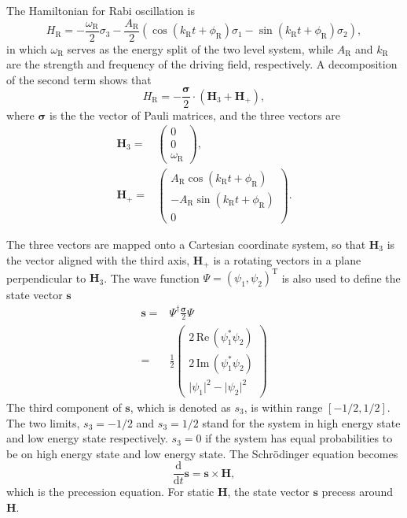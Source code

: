 \documentclass[%
reprint,
 amsmath,amssymb,
 prd,
]{revtex4-1}
\begin{document}
The Hamiltonian for Rabi oscillation is
\begin{equation}
    H_{\mathrm R} = -\frac{\omega_{\mathrm R}}{2}\sigma_3 - \frac{A_{\mathrm{R}} }{2}  \left( \cos(k_{\mathrm{R}} t +\phi_{\mathrm{R}})\sigma_1  - \sin(k_{\mathrm{R}} t +\phi_{\mathrm{R}}) \sigma_2\right),
    \label{rabi-oscillation-single-perturbation}
\end{equation}
in which $\omega_{\mathrm R}$ serves as the energy split of the two level system, while $A_{\mathrm{R}}$ and $k_{\mathrm{R}}$ are the strength and frequency of the driving field, respectively. A decomposition of the second term shows that
\begin{equation*}
H_{\mathrm R}
= - \frac{\boldsymbol{\sigma}}{2} \cdot (\mathbf{H}_3 + \mathbf{H}_+ ) ,
\end{equation*}
where $\boldsymbol{\sigma}$ is the the vector of Pauli matrices, and the three vectors are
\begin{align}
    \mathbf{H}_3 = & \begin{pmatrix}
    0 \\ 0 \\ \omega_{\mathrm R}
    \end{pmatrix}, \\
    \mathbf{H}_+ = & \begin{pmatrix}
    A_{\mathrm{R}} \cos(k_{\mathrm{R}} t +\phi_{\mathrm{R}}) \\
    - A_{\mathrm{R}} \sin(k_{\mathrm{R}} t +\phi_{\mathrm{R}}) \\
    0
    \end{pmatrix}.
\end{align}

The three vectors are mapped onto a Cartesian coordinate system, so that $\mathbf{H}_3$ is the vector aligned with the third axis, $\mathbf{H}_+$ is a rotating vectors in a plane perpendicular to $\mathbf{H}_3$. The wave function $\Psi=(\psi_1,\psi_2)^{\mathrm{T}}$ is also used to define the state vector $\mathbf{s}$
\begin{align}
    \mathbf{s} =& \Psi^\dagger \frac{\boldsymbol{\sigma}}{2}\Psi \\
    =& \frac{1}{2}\begin{pmatrix}
    2\,\mathrm{Re}\,(\psi_1^* \psi_2) \\
    2\,\mathrm{Im}\,(\psi_1^*\psi_2) \\
    \lvert \psi_1 \rvert^2 - \lvert \psi_2 \rvert^2
    \end{pmatrix}
\end{align}
The third component of $\mathbf{s}$, which is denoted as $s_3$, is within range $[-1/2,1/2]$. The two limits, $s_3=-1/2$ and $s_3=1/2$ stand for the system in high energy state and low energy state respectively. $s_3=0$ if the system has equal probabilities to be on high energy state and low energy state. The Schr\"odinger equation becomes
\begin{equation}
\frac{\mathrm{d}}{\mathrm{d} t } \mathbf{s} = \mathbf{s} \times \mathbf{H},
\end{equation}
which is the precession equation. For static $\mathbf{H}$, the state vector $\mathbf{s}$ precess around $\mathbf{H}$.
\end{document}
